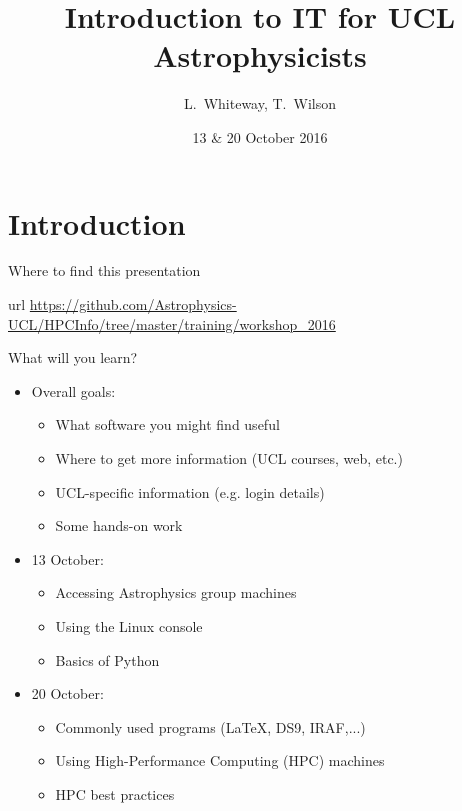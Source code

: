 \documentclass{beamer}
\title[IT Workshops] %
{Introduction to IT for UCL Astrophysicists}
\author[Whiteway, Wilson] %
{L.~Whiteway, T.~Wilson}
\institute[UCL]
{
  Department of Physics and Astronomy\\
  University College London
}
\date[IT 2016]
{13 \& 20 October 2016}
\begin{document}
\frame{\titlepage}

\section{Introduction}

\begin{frame}{Where to find this presentation}
  \begin{block}{url}
    \url{https://github.com/Astrophysics-UCL/HPCInfo/tree/master/training/workshop_2016}
  \end{block}
\end{frame}


\begin{frame}{What will you learn?}
  \begin{itemize}
    \item{Overall goals:}
    \begin{itemize}
      \item What software you might find useful
      \item Where to get more information (UCL courses, web, etc.)
      \item UCL-specific information (e.g. login details)
      \item Some hands-on work
    \end{itemize}
    \item{13 October:}
    \begin{itemize}
      \item Accessing Astrophysics group machines
      \item Using the Linux console
      \item Basics of Python
    \end{itemize}
    \item{20 October:}
    \begin{itemize}
    \item Commonly used programs (LaTeX, DS9, IRAF,...)
    \item Using High-Performance Computing (HPC) machines
    \item HPC best practices
    \end{itemize}
  \end{itemize}
\end{frame}
\end{document}
